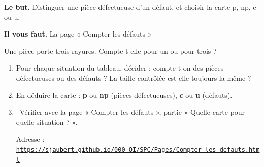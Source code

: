 \documentclass[10pt,a4paper]{article}
\begin{document}
\thispagestyle{fancy}
\begin{tcolorbox}[boite]\textbf{Le but.} Distinguer une pièce défectueuse d'un défaut, et choisir la carte p, np, c ou u.\par\textbf{Il vous faut.} La page « Compter les défauts »\end{tcolorbox}
\begin{tcolorbox}[pred]Une pièce porte trois rayures. Compte-t-elle pour un ou pour trois ?\reponse\end{tcolorbox}
\begin{enumerate}[label=\textcolor{cyan}{\textbf{\arabic*.}},leftmargin=15pt,itemsep=1.5pt]
\item Pour chaque situation du tableau, décider : compte-t-on des pièces défectueuses ou des défauts ? La taille contrôlée est-elle toujours la même ?
\item En déduire la carte : \textbf{p} ou \textbf{np} (pièces défectueuses), \textbf{c} ou \textbf{u} (défauts).
\item \tagW\ Vérifier avec la page « Compter les défauts », partie « Quelle carte pour quelle situation ? ».\par Adresse : \href{https://sjaubert.github.io/000_OI/SPC/Pages/Compter_les_defauts.html}{\nolinkurl{https://sjaubert.github.io/000_OI/SPC/Pages/Compter_les_defauts.html}}
\end{enumerate}
\par
\end{document}
